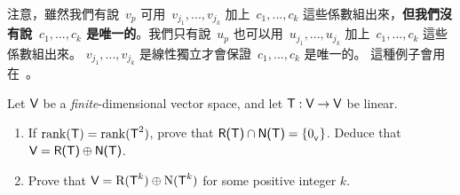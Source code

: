 \begin{note}
注意，雖然我們有說\ \(v_p\) 可用\ \(v_{j_1}, ..., v_{j_k}\) 加上\ \(c_1, ..., c_k\) 這些係數組出來，\textbf{但我們沒有說\ \(c_1, ..., c_k\) 是唯一的}。我們只有說\ \(u_p\) 也可以用\ \(u_{j_1}, ..., u_{j_k}\) 加上\ \(c_1, ..., c_k\) 這些係數組出來。
\(v_{j_1}, ..., v_{j_k}\) 是線性獨立才會保證\ \(c_1, ..., c_k\) 是唯一的。
這種例子會用在\ 。
\end{note}

\begin{exercise} \label{exercise 2.3.16}
Let \(\textsf{V}\) be a \emph{finite}-dimensional vector space, and let \(\textsf{T} : \textsf{V} \to \textsf{V}\) be linear.
\begin{enumerate}
\item If \(\mathrm{rank}(\textsf{T}) = \mathrm{rank}(\textsf{T}^2)\), prove that \(\textsf{R(T)} \cap \textsf{N(T)} = \{ 0_{_{\textsf{V}}} \}\).
    Deduce that \(\textsf{V} = \textsf{R(T)} \oplus \textsf{N(T)}\).
\item Prove that \(\textsf{V} = \mathrm{R}(\textsf{T}^k) \oplus \mathrm{N}(\textsf{T}^k)\) for some positive integer \(k\).
\end{enumerate}
\end{exercise}

